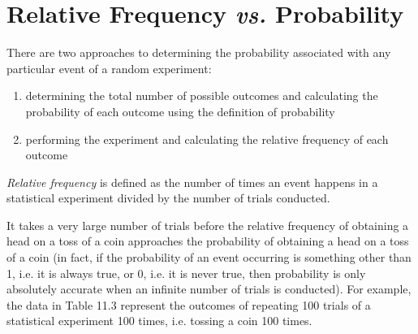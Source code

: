   
    \label{m39373*cid5}
            \section{ Relative Frequency \textsl{vs.}
Probability}
            \nopagebreak
            
      
      \label{m39373*id112458}There are two approaches to determining the
probability associated with any particular event of a random experiment:\par 
      \label{m39373*id112462}\begin{enumerate}[noitemsep, label=\textbf{\arabic*}. ] 
            \label{m39373*uid54}\item determining the total number of possible outcomes and
calculating the probability of each outcome using the definition of probability
\label{m39373*uid55}\item performing the experiment and calculating the relative
frequency of each outcome
\end{enumerate}
        
      \label{m39373*id112492}\textsl{Relative
frequency} is defined as the number of times an event happens in a
statistical experiment divided by the number of trials conducted.\par 
      \label{m39373*id112501}It takes a very large number of trials before the
relative frequency of obtaining a head on a toss of a coin approaches the
probability of obtaining a head on a toss of a coin (in fact, if the probability of an event occurring is something other than 1, i.e. it is always true, or 0, i.e. it is never true, then probability is only absolutely accurate when an infinite number of trials is conducted). For example, the data in
Table 11.3 represent the outcomes of repeating 100 trials of a
statistical experiment 100 times, i.e. tossing a coin 100 times.\par 
      
    
